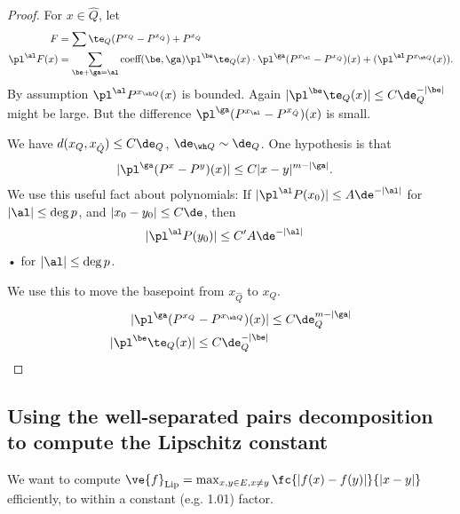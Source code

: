 \begin{proof}
For $x\in \hat Q$, let
\begin{align}
F &= \sum \te_{Q} (P^{x_Q}-P^{x_{\hat Q}}) + P^{x_{\hat Q}}\\
\pl^\al F(x) &= \sum_{\be + \ga=\al}
\text{coeff}(\be, \ga) \pl^\be \te_Q(x) \cdot 
\pl^\ga(P^{x_\al}-P^{x_{\hat Q}})(x) + (\pl^{\al}P^{x_{\wh Q}}(x)).
\end{align}
By assumption $\pl^\al P^{x_{\wh Q}}(x)$ is bounded. Again $|\pl^\be \te_Q(x)|\le C\de_Q^{-|\be|}$ might be large. But the difference $\pl^\ga(P^{x_\al}-P^{x_{\hat Q}})(x)$ is small. 

We have $d(x_Q,x_{\hat Q}) \le C\de_Q$, $\de_{\wh Q}\sim \de_Q$. One hypothesis is that 
\begin{align}
|\pl^\ga (P^x - P^y) (x)|
&\le C |x-y|^{m-|\ga|}.
\end{align}
We use this useful fact about polynomials: 
If $|\pl^\al P(x_0)|\le A\de^{-|\al|}$ for $|\al|\le \deg p$, and $|x_0-y_0|\le C\de$, then 
\begin{align}
|\pl^\al P(y_0)|&\le C' A \de^{-|\al|}
\end{align}•
for $|\al|\le \deg p$. 

We use this to move the basepoint from $x_{\hat Q}$ to $x_Q$. 
\begin{align}
 |\pl^\ga(P^{x_Q}-P^{x_{\wh Q}})(x)|&\le C \de_Q^{m-|\ga|}
\\
|\pl^\be \te_Q(x) | \le C\de_Q^{-|\be|}%
\end{align}
\end{proof}

\subsection{Using the well-separated pairs decomposition to compute the Lipschitz constant}
We want to compute $\ve{f}_{\text{Lip}} = \max_{x,y\in E,x\ne y} \fc{|f(x)-f(y)|}{|x-y|}$ efficiently, to within a constant (e.g. 1.01) factor. 

